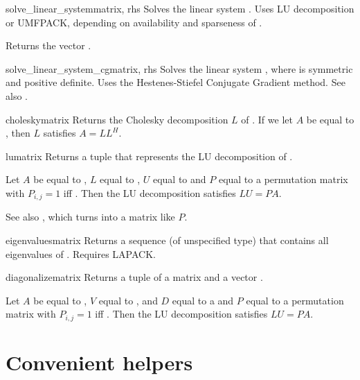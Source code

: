 \begin{funcdesc}{solve_linear_system}{matrix, rhs}
  Solves the linear system . Uses LU
  decomposition or UMFPACK, depending on availability and sparseness
  of .

  Returns the vector .
\end{funcdesc}
\begin{funcdesc}{solve_linear_system_cg}{matrix, rhs}
  Solves the linear system , where  is
  symmetric and positive definite. Uses the Hestenes-Stiefel Conjugate
  Gradient method. See also .
\end{funcdesc}
\begin{funcdesc}{cholesky}{matrix}
  Returns the Cholesky decomposition $L$ of . If we let $A$
  be equal to , then $L$ satisfies $A=L L^H$.
\end{funcdesc}
\begin{funcdesc}{lu}{matrix}
  Returns a tuple  that represents the LU
  decomposition of .

  Let $A$ be equal to , $L$ equal to , $U$ equal
  to  and $P$ equal to a permutation matrix with $P_{i,j}=1$
  iff . Then the LU decomposition satisfies $LU=PA$.

  See also , which turns 
  into a matrix like $P$.
\end{funcdesc}
\begin{funcdesc}{eigenvalues}{matrix}
  Returns a sequence (of unspecified type) that contains all eigenvalues
  of . Requires LAPACK.
\end{funcdesc}
\begin{funcdesc}{diagonalize}{matrix}
  Returns a tuple  of a matrix  and a vector .

  Let $A$ be equal to , $V$ equal to , and $D$ equal
  to a  and $P$ equal to a permutation matrix with $P_{i,j}=1$
  iff . Then the LU decomposition satisfies $LU=PA$.
\end{funcdesc}


\section{Convenient helpers}

